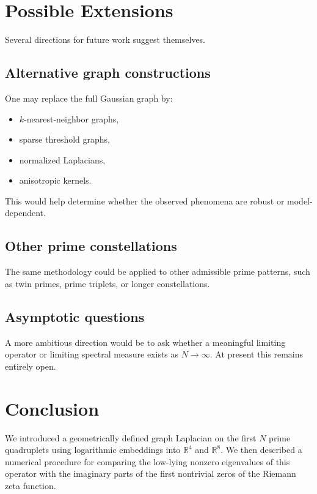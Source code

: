 \documentclass[11pt,a4paper]{article}
\newcommand{\R}{\mathbb{R}}
\begin{document}
	\section{Possible Extensions}
	
	Several directions for future work suggest themselves.
	
	\subsection{Alternative graph constructions}
	
	One may replace the full Gaussian graph by:
	\begin{itemize}
		\item \(k\)-nearest-neighbor graphs,
		\item sparse threshold graphs,
		\item normalized Laplacians,
		\item anisotropic kernels.
	\end{itemize}
	
	This would help determine whether the observed phenomena are robust or model-dependent.
	
	\subsection{Other prime constellations}
	
	The same methodology could be applied to other admissible prime patterns, such as twin primes, prime triplets, or longer constellations.
	
	\subsection{Asymptotic questions}
	
	A more ambitious direction would be to ask whether a meaningful limiting operator or limiting spectral measure exists as \(N\to\infty\). At present this remains entirely open.
	
	\section{Conclusion}
	
	We introduced a geometrically defined graph Laplacian on the first \(N\) prime quadruplets using logarithmic embeddings into \(\R^4\) and \(\R^8\). We then described a numerical procedure for comparing the low-lying nonzero eigenvalues of this operator with the imaginary parts of the first nontrivial zeros of the Riemann zeta function.
	
\end{document}

